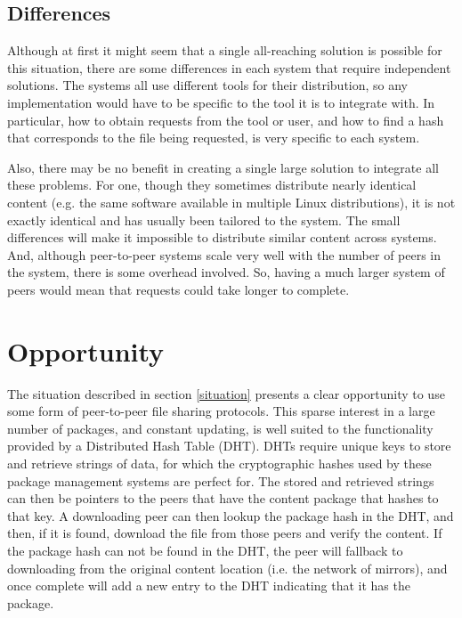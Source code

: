 \documentclass[conference]{IEEEtran}
\begin{document}
\subsection{Differences}
\label{differences}

Although at first it might seem that a single all-reaching solution
is possible for this situation, there are some differences in each
system that require independent solutions. The systems all use
different tools for their distribution, so any implementation would
have to be specific to the tool it is to integrate with. In
particular, how to obtain requests from the tool or user, and how to
find a hash that corresponds to the file being requested, is very
specific to each system.

Also, there may be no benefit in creating a single large solution to
integrate all these problems. For one, though they sometimes
distribute nearly identical content (e.g. the same software
available in multiple Linux distributions), it is not exactly
identical and has usually been tailored to the system. The small
differences will make it impossible to distribute similar content
across systems. And, although peer-to-peer systems scale very well
with the number of peers in the system, there is some overhead
involved. So, having a much larger system of peers would mean that
requests could take longer to complete.


\section{Opportunity}
\label{opportunity}

The situation described in section \ref{situation} presents a clear
opportunity to use some form of peer-to-peer file sharing protocols.
This sparse interest in a large number of packages, and constant
updating, is well suited to the functionality provided by a
Distributed Hash Table (DHT). DHTs require unique keys to store and
retrieve strings of data, for which the cryptographic hashes used by
these package management systems are perfect for. The stored and
retrieved strings can then be pointers to the peers that have the
content package that hashes to that key. A downloading peer can then
lookup the package hash in the DHT, and then, if it is found,
download the file from those peers and verify the content. If the
package hash can not be found in the DHT, the peer will fallback to
downloading from the original content location (i.e. the network of
mirrors), and once complete will add a new entry to the DHT
indicating that it has the package.
\end{document}
